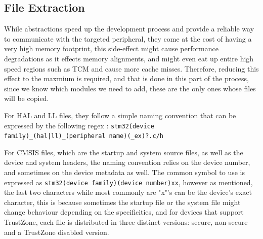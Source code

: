 \subsection{File Extraction}
While abstractions speed up the development process and provide a reliable way to communicate with the targeted peripheral, they come at the cost of having a very high memory footprint, this side-effect might cause performance degradations as it effects memory alignments, and might even eat up entire high speed regions such as TCM and cause more cache misses. Therefore, reducing this effect to the maxmium is required, and that is done in this part of the process, since we know which modules we need to add, these are the only ones whose files will be copied.
\par \noindent
For HAL and LL files, they follow a simple naming convention that can be expressed by the following regex : \texttt{stm32(device family)\_(hal|ll)\_(peripheral name)(\_ex)?.c/h}
\par \noindent
For CMSIS files, which are the startup and system source files, as well as the device and system headers, the naming convention relies on the device number, and sometimes on the device metadata as well. The common symbol to use is expressed as \texttt{stm32(device family)(device number)xx}, however as mentioned, the last two characters while most commonly are "x"'s can be the device's exact character, this is because sometimes the startup file or the system file might change behaviour depending on the specificities, and for devices that support TrustZone, each file is distributed in three distinct versions: secure, non-secure and a TrustZone disabled version.
